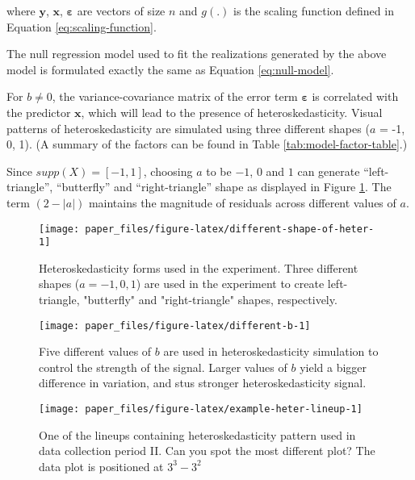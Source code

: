 \documentclass[]{interact}
\theoremstyle{plain}%
\theoremstyle{definition}
\theoremstyle{remark}
\begin{document}
\noindent where \(\boldsymbol{y}\), \(\boldsymbol{x}\),
\(\boldsymbol{\varepsilon}\) are vectors of size \(n\) and \(g(.)\) is
the scaling function defined in Equation \ref{eq:scaling-function}.

The null regression model used to fit the realizations generated by the
above model is formulated exactly the same as Equation
\ref{eq:null-model}.

For \(b \neq 0\), the variance-covariance matrix of the error term
\(\boldsymbol{\varepsilon}\) is correlated with the predictor
\(\boldsymbol{x}\), which will lead to the presence of
heteroskedasticity. Visual patterns of heteroskedasticity are simulated
using three different shapes (\(a\) = -1, 0, 1). (A summary of the
factors can be found in Table \ref{tab:model-factor-table}.)

Since \(supp(X) = [-1, 1]\), choosing \(a\) to be \(-1\), \(0\) and
\(1\) can generate ``left-triangle'', ``butterfly'' and
``right-triangle'' shape as displayed in Figure
\ref{fig:different-shape-of-heter}. The term \((2 - |a|)\) maintains the
magnitude of residuals across different values of \(a\).

\begin{figure}

{\centering \texttt{[image: paper\_files/figure-latex/different-shape-of-heter-1]} 

}

\caption{Heteroskedasticity forms used in the experiment. Three different shapes ($a = -1, 0, 1$) are used in the experiment to create left-triangle, "butterfly" and "right-triangle" shapes, respectively.}\label{fig:different-shape-of-heter}
\end{figure}

\begin{figure}

{\centering \texttt{[image: paper\_files/figure-latex/different-b-1]} 

}

\caption{Five different values of $b$ are used in heteroskedasticity simulation to control the strength of the signal. Larger values of $b$ yield a bigger difference in variation, and stus stronger heteroskedasticity signal.}\label{fig:different-b}
\end{figure}

\begin{figure}[t!]

{\centering \texttt{[image: paper\_files/figure-latex/example-heter-lineup-1]} 

}

\caption{One of the lineups containing heteroskedasticity pattern used in data collection period II. Can you spot the most different plot? The data plot is positioned at $3^3 - 3^2$}\label{fig:example-heter-lineup}
\end{figure}
\end{document}
